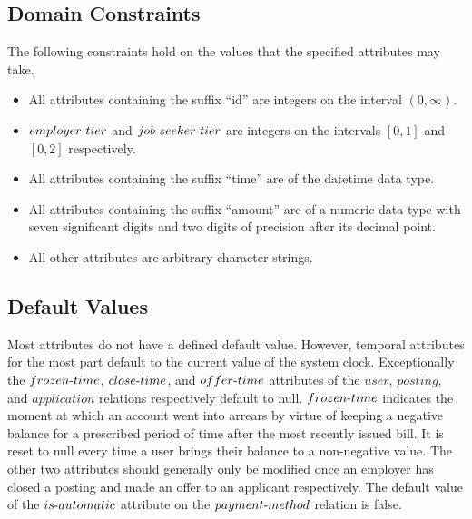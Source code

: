 \documentclass{article}
\newcommand{\tdash}{\textnormal{-}}
\begin{document}
        \subsection{Domain Constraints}
            The following constraints hold on the values that the specified attributes may take.
            \begin{itemize}
                \item All attributes containing the suffix ``id'' are integers on the interval $(0, \infty)$.
                \item $employer \tdash tier$ and $job \tdash seeker \tdash tier$ are integers on the intervals $[0, 1]$
                    and $[0, 2]$ respectively.
                \item All attributes containing the suffix ``time'' are of the datetime data type.
                \item All attributes containing the suffix ``amount'' are of a numeric data type with seven significant
                    digits and two digits of precision after its decimal point.
                \item All other attributes are arbitrary character strings.
            \end{itemize}
            \subsection{Default Values}
                Most attributes do not have a defined default value. However, temporal attributes for the most part
                default to the current value of the system clock. Exceptionally the $frozen\tdash time$, $close \tdash
                time$, and $offer \tdash time$ attributes of the $user$, $posting$, and $application$ relations
                respectively default to null. $frozen \tdash time$ indicates the moment at which an account went into
                arrears by virtue of keeping a negative balance for a prescribed period of time after the most recently
                issued bill. It is reset to null every time a user brings their balance to a non-negative value. The
                other two attributes should generally only be modified once an employer has closed a posting and made
                an offer to an applicant respectively. The default value of the $is\tdash automatic$ attribute on the
                $payment \tdash method$ relation is false.
\end{document}
